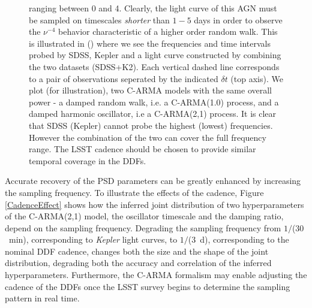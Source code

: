 \begin{figure}
{  ranging between 0 and 4. Clearly, the light curve of this AGN must be sampled on
  timescales {\em shorter} than $1-5$ days in order to observe the $\nu^{-4}$ behavior
  characteristic of a higher order random walk. This is illustrated in ()
  where we see the frequencies and time intervals probed by SDSS, Kepler and a light curve
  constructed by combining the two datasets (SDSS+K2). Each vertical dashed line corresponds to
  a pair of observations seperated by the indicated $\delta t$ (top axis). We plot (for
  illustration), two C-ARMA models with the same overall power - a damped random walk, i.e. a
  C-ARMA(1.0) process, and a damped harmonic oscillator, i.e a C-ARMA(2,1) process.
  It is clear that SDSS (Kepler) cannot probe the highest (lowest) frequencies. However the
  combination of the two can cover the full frequency range. The LSST cadence should be chosen
  to provide similar temporal coverage in the DDFs.}
  \label{PSDvsFreq}
\end{figure}

Accurate recovery of the PSD parameters can be greatly enhanced by increasing the
sampling frequency. To illustrate the effects of the cadence, Figure \ref{CadenceEffect}
shows how the inferred joint distribution of two hyperparameters of the C-ARMA(2,1)
model, the oscillator timescale and the damping ratio, depend on the sampling frequency.
Degrading the sampling frequency from $1/$($30$~min), corresponding to {\em Kepler}
light curves, to $1/$($3$~d), corresponding to the nominal DDF cadence, changes both
the size and the shape of the joint distribution, degrading both the accuracy and
correlation of the inferred hyperparameters.
%
Furthermore, the C-ARMA formalism may enable adjusting the cadence of the DDFs once
the LSST survey begins to determine the sampling pattern in real time.

